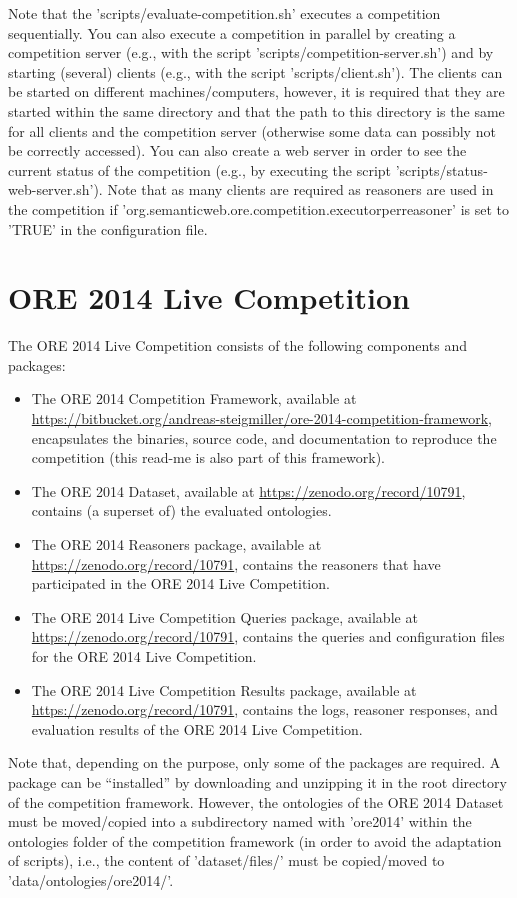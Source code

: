 \documentclass{article}
\begin{document}
Note that the 'scripts/evaluate-competition.sh' executes a competition sequentially. 
You can also execute a competition in parallel by creating a competition server (e.g., with the script 'scripts/competition-server.sh') and by starting (several) clients (e.g., with the script 'scripts/client.sh').
The clients can be started on different machines/computers, however, it is required that they are started within the same directory and that the path to this directory is the same for all clients and the competition server (otherwise some data can possibly not be correctly accessed).
You can also create a web server in order to see the current status of the competition (e.g., by executing the script 'scripts/status-web-server.sh').
Note that as many clients are required as reasoners are used in the competition if 'org.semanticweb.ore.competition.executorperreasoner' is set to 'TRUE' in the configuration file.


\section{ORE 2014 Live Competition}


The ORE 2014 Live Competition consists of the following components and packages:
\begin{itemize}
\item The ORE 2014 Competition Framework, available at \url{https://bitbucket.org/andreas-steigmiller/ore-2014-competition-framework}, encapsulates the binaries, source code, and documentation to reproduce the competition (this read-me is also part of this framework).
\item The ORE 2014 Dataset, available at \url{https://zenodo.org/record/10791}, contains (a superset of) the evaluated ontologies.
\item The ORE 2014 Reasoners package, available at \url{https://zenodo.org/record/10791}, contains the reasoners that have participated in the ORE 2014 Live Competition.
\item The ORE 2014 Live Competition Queries package, available at \url{https://zenodo.org/record/10791}, contains the queries and configuration files for the ORE 2014 Live Competition.
\item The ORE 2014 Live Competition Results package, available at \url{https://zenodo.org/record/10791}, contains the logs, reasoner responses, and evaluation results of the ORE 2014 Live Competition.
\end{itemize}

Note that, depending on the purpose, only some of the packages are required. 
A package can be ``installed'' by downloading and unzipping it in the root directory of the competition framework.
However, the ontologies of the ORE 2014 Dataset must be moved/copied into a subdirectory named with 'ore2014' within the ontologies folder of the competition framework (in order to avoid the adaptation of scripts), i.e., the content of 'dataset/files/' must be copied/moved to 'data/ontologies/ore2014/'.
\end{document}
